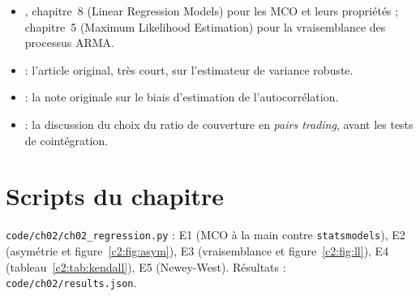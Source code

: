 \begin{toread}
\begin{itemize}[leftmargin=1.2em]
\item \citet{hamilton1994}, chapitre~8 (\og Linear Regression Models\fg) pour les MCO et leurs propriétés ; chapitre~5 (\og Maximum Likelihood Estimation\fg) pour la vraisemblance des processus ARMA.
\item \citet{neweywest1987} : l'article original, très court, sur l'estimateur de variance robuste.
\item \citet{kendall1954} : la note originale sur le biais d'estimation de l'autocorrélation.
\item \citet{vidyamurthy2004} : la discussion du choix du ratio de couverture en \emph{pairs trading}, avant les tests de cointégration.
\end{itemize}
\end{toread}

\section{Scripts du chapitre}
\noindent\texttt{code/ch02/ch02\_regression.py} : E1 (MCO à la main contre \texttt{statsmodels}), E2 (asymétrie et figure~\ref{c2:fig:asym}), E3 (vraisemblance et figure~\ref{c2:fig:ll}), E4 (tableau~\ref{c2:tab:kendall}), E5 (Newey-West). Résultats : \texttt{code/ch02/results.json}.
